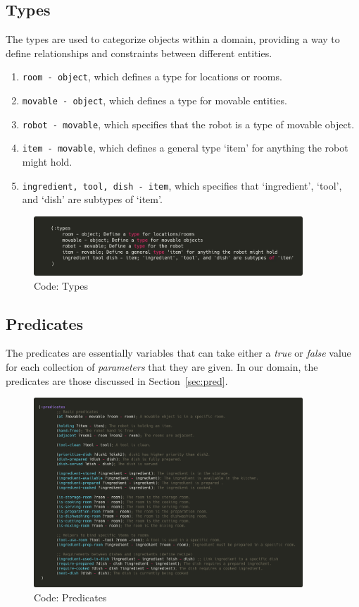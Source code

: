 \documentclass{article}
\begin{document}
\subsection{Types}
The types are used to categorize objects within a domain, providing a way to define relationships and constraints between different entities.
\begin{enumerate}
    \item \texttt{room - object}, which defines a type for locations or rooms.
    \item \texttt{movable - object}, which defines a type for movable entities.
    \item \texttt{robot - movable}, which specifies that the robot is a type of movable object.
    \item \texttt{item - movable}, which defines a general type `item' for anything the robot might hold.
    \item \texttt{ingredient, tool, dish - item}, which specifies that `ingredient', `tool', and `dish' are subtypes of `item'.    
\end{enumerate}
\begin{figure}[H]
    \centering
    \includegraphics[width=0.90\textwidth]{assets/types.jpeg}
    \caption{Code: Types}
    \label{fig:types}
\end{figure}

\subsection{Predicates}
The predicates are essentially variables that can take either a \textit{true} or \textit{false} value for each collection of \textit{parameters} that they are given. In our domain, the predicates are those discussed in Section~\ref{sec:pred}.
\begin{figure}[H]
    \centering
    \includegraphics[width=0.90\textwidth]{assets/predicates.png}
    \caption{Code: Predicates}
    \label{fig:pred}
\end{figure}
\end{document}
